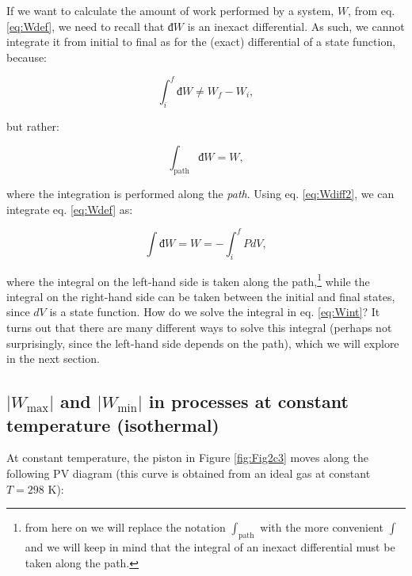 \documentclass[
  9pt,
]{extbook}
\theoremstyle{definition}
\theoremstyle{definition}
\theoremstyle{definition}
\theoremstyle{definition}
\theoremstyle{remark}
\begin{document}
If we want to calculate the amount of work performed by a system, \(W\), from eq. \eqref{eq:Wdef}, we need to recall that \(đ W\) is an inexact differential. As such, we cannot integrate it from initial to final as for the (exact) differential of a state function, because:

\begin{equation}
  \int_{i}^{f}đ W \neq W_f - W_i,
  \label{eq:Wdiff}
\end{equation}

but rather:

\begin{equation}
  \int_{\text{path}} đ W = W,
  \label{eq:Wdiff2}
\end{equation}

where the integration is performed along the \emph{path}. Using eq. \eqref{eq:Wdiff2}, we can integrate eq. \eqref{eq:Wdef} as:

\begin{equation}
  \int đ W = W = - \int_{i}^{f} PdV,
  \label{eq:Wint}
\end{equation}

where the integral on the left-hand side is taken along the path,\footnote{from here on we will replace the notation \(\int_{\text{path}}\) with the more convenient \(\int\) and we will keep in mind that the integral of an inexact differential must be taken along the path.} while the integral on the right-hand side can be taken between the initial and final states, since \(dV\) is a state function.
How do we solve the integral in eq. \eqref{eq:Wint}? It turns out that there are many different ways to solve this integral (perhaps not surprisingly, since the left-hand side depends on the path), which we will explore in the next section.

\subsection{\texorpdfstring{\(| W_{\text{max}} |\) and \(| W_{\text{min}} |\) in processes at constant temperature (isothermal)}{\textbar{} W\_\{\textbackslash text\{max\}\} \textbar{} and \textbar{} W\_\{\textbackslash text\{min\}\} \textbar{} in processes at constant temperature (isothermal)}}\label{w_textmax-and-w_textmin-in-processes-at-constant-temperature-isothermal}

At constant temperature, the piston in Figure \ref{fig:Fig2c3} moves along the following PV diagram (this curve is obtained from an ideal gas at constant \(T=298\) K):
\end{document}
